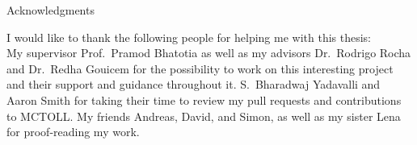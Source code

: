 \thispagestyle{empty}

\vspace*{20mm}

\begin{center}
    { Acknowledgments}
\end{center}

\vspace{10mm}

I would like to thank the following people for helping me with this thesis:\\
My supervisor Prof.\ Pramod Bhatotia as well as my advisors Dr.\ Rodrigo Rocha and Dr.\ Redha Gouicem for the possibility to work on this interesting project and their support and guidance throughout it.
S.\ Bharadwaj Yadavalli and Aaron Smith for taking their time to review my pull requests and contributions to MCTOLL.
My friends Andreas, David, and Simon, as well as my sister Lena for proof-reading my work.

\cleardoublepage{}
